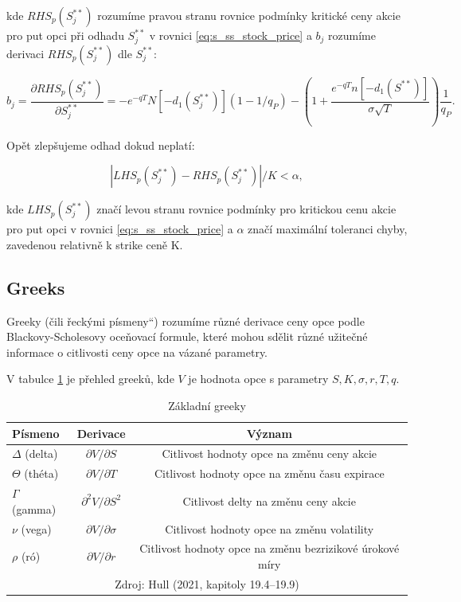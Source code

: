 \documentclass[male,czech,api_bc]{kitheses}
\newcommand{\UV}[1]{\quotedblbase#1\textquotedblleft}
\begin{document}
  kde $RHS_p(S^{**}_j)$ rozumíme pravou stranu rovnice podmínky kritické ceny akcie pro put opci při odhadu $S^{**}_j$ v rovnici \eqref{eq:s_ss_stock_price} a $b_j$ rozumíme derivaci $RHS_p(S^{**}_j)$ dle $S^{**}_j$:

  \begin{equation}
    b_j = \frac{\partial RHS_p(S^{**}_j)}{\partial S^{**}_j} = -e^{-qT} N [-d_1(S^{**}_j)] (1 - 1/q_P) - \left( 1 + \frac{e^{-qT}n[-d_1(S^{**})]}{\sigma \sqrt{T}} \right) \frac{1}{q_P}.
  \end{equation}

  Opět zlepšujeme odhad dokud neplatí:

  \begin{equation}
    |LHS_p(S^{**}_j) - RHS_p(S^{**}_j)| / K < \alpha,
  \end{equation}

  kde $LHS_p(S^{**}_j)$ značí levou stranu rovnice podmínky pro kritickou cenu akcie pro put opci v rovnici \eqref{eq:s_ss_stock_price} a $\alpha$ značí maximální toleranci chyby, zavedenou relativně k strike ceně K.

  \subsection{Greeks}

  Greeky (čili \UV{řeckými písmeny}) rozumíme různé derivace ceny opce podle Blackovy-Scholesovy oceňovací formule, které mohou sdělit různé užitečné informace o citlivosti ceny opce na vázané parametry.

  V tabulce \ref{tab:greeks} je přehled greeků, kde $V$ je hodnota opce s parametry $S, K, \sigma, r, T, q$.

  \begin{table}[h]
    \centering
    \caption{Základní greeky}
    \label{tab:greeks}
    \begin{tabular}{lcc}  %
      \toprule
      Písmeno & Derivace & Význam \\
      \midrule
      $\Delta$ (delta) & ${\partial V}/{\partial S}$ & Citlivost hodnoty opce na změnu ceny akcie \\
      $\Theta$ (théta) & ${\partial V}/{\partial T}$ & Citlivost hodnoty opce na změnu času expirace \\
      $\Gamma$ (gamma) & $\partial^2 V / \partial S^2$ & Citlivost delty na změnu ceny akcie\\
      $\nu$ (vega) & $\partial V / \partial \sigma$ & Citlivost hodnoty opce na změnu volatility \\
      $\rho$ (ró) & $\partial V / \partial r$ & Citlivost hodnoty opce na změnu bezrizikové úrokové míry \\
      \bottomrule
      \multicolumn{3}{c}{Zdroj: Hull (2021, kapitoly 19.4--19.9)}
    \end{tabular}
  \end{table}
\end{document}
